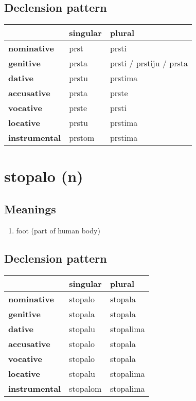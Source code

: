 \subsection*{Declension pattern}
\begin{tabularx}{\linewidth}{Xll}
\toprule
{} & singular &                     plural \\
\midrule
\textbf{nominative  } &     prst &                      prsti \\
\textbf{genitive    } &    prsta &  prsti / prstiju / prsta \\
\textbf{dative      } &    prstu &                    prstima \\
\textbf{accusative  } &    prsta &                      prste \\
\textbf{vocative    } &    prste &                      prsti \\
\textbf{locative    } &    prstu &                    prstima \\
\textbf{instrumental} &   prstom &                    prstima \\
\bottomrule
\end{tabularx}

\filbreak
\section{stopalo (n)}
\subsection*{Meanings}
\begin{enumerate}
\item foot (part of human body)
\end{enumerate}
\subsection*{Declension pattern}
\begin{tabularx}{\linewidth}{Xll}
\toprule
{} &  singular &     plural \\
\midrule
\textbf{nominative  } &   stopalo &    stopala \\
\textbf{genitive    } &   stopala &    stopala \\
\textbf{dative      } &   stopalu &  stopalima \\
\textbf{accusative  } &   stopalo &    stopala \\
\textbf{vocative    } &   stopalo &    stopala \\
\textbf{locative    } &   stopalu &  stopalima \\
\textbf{instrumental} &  stopalom &  stopalima \\
\bottomrule
\end{tabularx}

